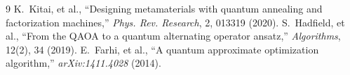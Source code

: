 \documentclass[11pt,a4paper]{ltjsarticle}
\begin{document}
\vspace{1mm}
{\scriptsize
\begin{thebibliography}{9}\setlength{\itemsep}{-2pt}
 K.~Kitai, et al., ``Designing metamaterials with quantum annealing and factorization machines,'' \textit{Phys. Rev. Research}, 2, 013319 (2020).
 S.~Hadfield, et al., ``From the QAOA to a quantum alternating operator ansatz,'' \textit{Algorithms}, 12(2), 34 (2019).
 E.~Farhi, et al., ``A quantum approximate optimization algorithm,'' \textit{arXiv:1411.4028} (2014).
\end{thebibliography}
}
\end{document}
